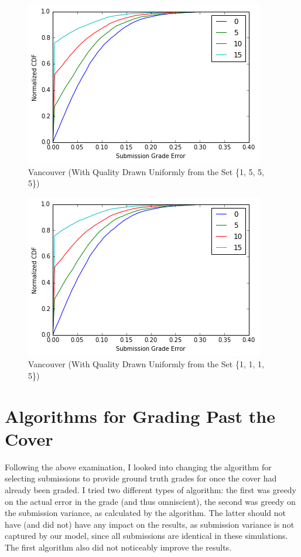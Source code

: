 \documentclass{article}
\begin{document}
	\begin{figure}[h]
		\includegraphics{vancouver-cover-random.png}
		\caption{Vancouver (With Quality Drawn Uniformly from the Set \{1, 5, 5, 5\})}
	\end{figure}
	
	\begin{figure}[h]
		\includegraphics{vancouver-cover-random.png}
		\caption{Vancouver (With Quality Drawn Uniformly from the Set \{1, 1, 1, 5\})}
	\end{figure}
	
	
	\section{Algorithms for Grading Past the Cover}
	Following the above examination, I looked into changing the algorithm for selecting submissions to provide ground truth grades for once the cover had already been graded. I tried two different types of algorithm: the first was greedy on the actual error in the grade (and thus omniscient), the second was greedy on the submission variance, as calculated by the algorithm. The latter should not have (and did not) have any impact on the results, as submission variance is not captured by our model, since all submissions are identical in these simulations. The first algorithm also did not noticeably improve the results.
	
\end{document}
